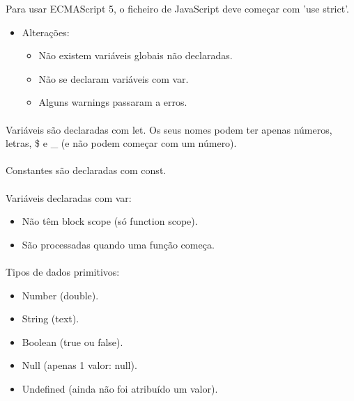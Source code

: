 \documentclass[../resumosLTW.tex]{subfiles}
\begin{document}
 

Para usar ECMAScript 5, o ficheiro de JavaScript deve começar com 'use strict'.
\begin{itemize}
    \item Alterações:
    \begin{itemize}
        \item Não existem variáveis globais não declaradas.
        \item Não se declaram variáveis com var.
        \item Alguns warnings passaram a erros.
    \end{itemize}
\end{itemize}

\paragraph{}

Variáveis são declaradas com let. Os seus nomes podem ter apenas números, letras, \$ e \_ (e não podem começar com um número).

\paragraph{}

Constantes são declaradas com const.

\paragraph{}

Variáveis declaradas com var:
\begin{itemize}
    \item Não têm block scope (só function scope).
    \item São processadas quando uma função começa.
\end{itemize}

\paragraph{}

Tipos de dados primitivos:
\begin{itemize}
    \item Number (double).
    \item String (text).
    \item Boolean (true ou false).
    \item Null (apenas 1 valor: null).
    \item Undefined (ainda não foi atribuído um valor).
\end{itemize}
\end{document}
